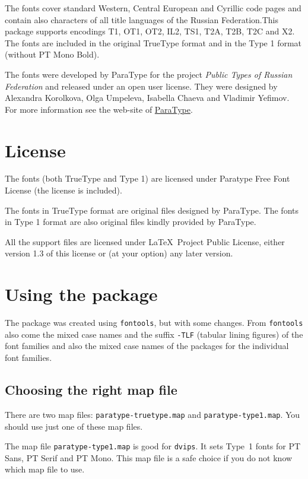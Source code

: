 \documentclass[oneside]{scrartcl}
\newcommand{\code}{\texttt}
\newcommand{\program}{\texttt}
\begin{document}
The fonts cover standard Western, Central European and Cyrillic code
pages and contain also characters of all title languages of the
Russian Federation.This package supports encodings T1, OT1, OT2, IL2,
TS1, T2A, T2B, T2C and X2. The fonts are included in the original
TrueType format and in the Type 1 format (without PT Mono Bold).

The fonts were developed by ParaType for the project \emph{Public Types
of Russian Federation} and released under an open user license.
They were designed by Alexandra Korolkova, Olga Umpeleva, Isabella Chaeva
and Vladimir Yefimov. For more information see the
web-site of \href{http://www.paratype.com}{ParaType}.


\section{License}

The fonts (both TrueType and Type 1) are licensed under Paratype Free
Font License (the license is included).

The fonts in TrueType format are original files designed by ParaType. The
fonts in Type 1 format are also original files kindly provided by ParaType.

All the support files are licensed under \LaTeX\ Project Public License,
either version 1.3 of this license or (at  your option) any later version.


\section{Using the package}

The package was created using \code{fontools}, but with some changes. From
\code{fontools} also come the mixed case names and the suffix \code{-TLF}
(tabular lining figures) of the font families and also the mixed case
names of the packages for the individual font families.


\subsection{Choosing the right map file}

There are two map files: \code{paratype-truetype.map} and
\code{paratype-type1.map}.
You should use just one of these map files. 

The map file \code{paratype-type1.map} is good for \program{dvips}. It sets
Type~1 fonts for PT Sans, PT Serif and PT Mono.
This map file is a safe choice if you do not know which map file to use.
\end{document}
